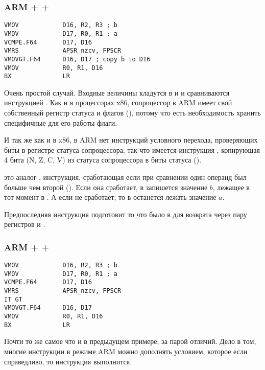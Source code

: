 ﻿\subsubsection{ARM + \OptimizingXcode + \ARMMode}

\begin{lstlisting}[caption=\OptimizingXcode + \ARMMode]
VMOV            D16, R2, R3 ; b
VMOV            D17, R0, R1 ; a
VCMPE.F64       D17, D16
VMRS            APSR_nzcv, FPSCR
VMOVGT.F64      D16, D17 ; copy b to D16
VMOV            R0, R1, D16
BX              LR
\end{lstlisting}

Очень простой случай. Входные величины кладутся в  и  и сравниваются инструкцией 
.
Как и в процессорах x86, сопроцессор в ARM имеет свой собственный регистр статуса и флагов (),
потому что есть необходимость хранить специфичные для его работы флаги.

И так же как и в x86, в ARM нет инструкций условного перехода, 
проверяющих биты в регистре статуса сопроцессора, так что имеется инструкция , копирующая 4 бита
(N, Z, C, V) из статуса сопроцессора в биты  статуса ().

 это аналог , инструкция, сработающая если при сравнении один операнд 
был больше чем второй
(). Если она сработает, в  запишется значение $b$, лежащее в тот момент 
в .
А если не сработает, то в  останется лежать значение $a$.

Предпоследняя инструкция подготовит то что было в  для возврата через пару регистров \Rzero 
и \Rone.

\subsubsection{ARM + \OptimizingXcode + \ThumbTwoMode}

\begin{lstlisting}[caption=\OptimizingXcode + \ThumbTwoMode]
VMOV            D16, R2, R3 ; b
VMOV            D17, R0, R1 ; a
VCMPE.F64       D17, D16
VMRS            APSR_nzcv, FPSCR
IT GT 
VMOVGT.F64      D16, D17
VMOV            R0, R1, D16
BX              LR
\end{lstlisting}

Почти то же самое что и в предыдущем примере, за парой отличий. Дело в том, многие инструкции в режиме ARM
можно дополнять условием, которое если справедливо, то инструкция выполнится.

